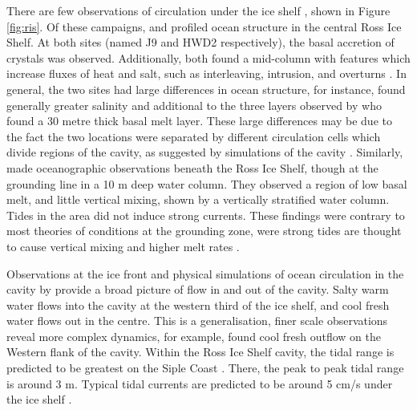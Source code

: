 There are few observations of circulation under the ice shelf \citep[e.g.][]{jacobs1979circulation,stewart2018ice,stevens2020ocean,robinson2020ice}, shown in Figure \ref{fig:ris}.
Of these campaigns, \cite{jacobs1979circulation} and \cite{stevens2020ocean} profiled ocean structure in the central Ross Ice Shelf. At both sites (named J9 and HWD2 respectively), the basal accretion of crystals was observed. Additionally, both found a mid-column with features which increase fluxes of heat and salt, such as interleaving, intrusion, and overturns  \citep{stevens2020ocean}. In general, the two sites had large differences in ocean structure, for instance, \cite{stevens2020ocean} found generally greater salinity and additional to the three layers observed by \cite{jacobs1979circulation} who found a 30 metre thick basal melt layer. These large differences may be due to the fact the two locations were separated by different circulation cells which divide regions of the cavity, as suggested by simulations of the cavity \citep{pritchard2012antarctic}.
Similarly, \cite{begeman2018ocean} made oceanographic observations beneath the Ross Ice Shelf, though at the grounding line in a 10 m deep water column. They observed a region of low basal melt, and little vertical mixing, shown by a vertically stratified water column. Tides in the area did not induce strong currents. These findings were contrary to most theories of conditions at the grounding zone, were strong tides are thought to cause vertical mixing and higher melt rates \citep[e.g.][]{macayeal1984thermohaline}.

Observations at the ice front \citep[e.g.][]{smethie2005circulation} and physical simulations of ocean circulation in the cavity by \cite{holland2003ice} provide a broad picture of flow in and out of the cavity. Salty warm water flows into the cavity at the western third of the ice shelf, and cool fresh water flows out in the centre. This is a generalisation, finer scale observations reveal more complex dynamics, for example, \cite{robinson2014evolution} found cool fresh outflow on the Western flank of the cavity. 
Within the Ross Ice Shelf cavity, the tidal range is predicted to be greatest on the Siple Coast \citep{padman2003tides}. There, the peak to peak tidal range is around 3 m. Typical tidal currents are predicted to be around 5 cm/s under the ice shelf \citep{padman2003tides}.


